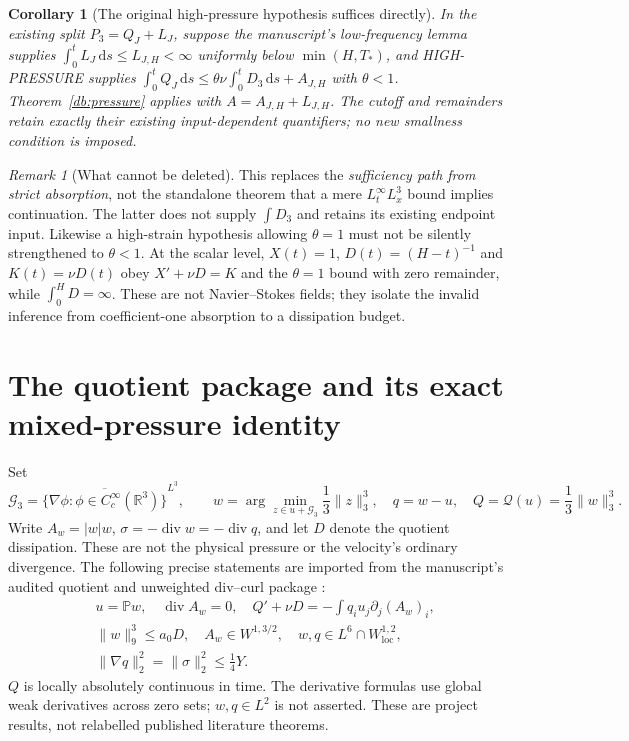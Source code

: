 \documentclass[11pt,a4paper]{article}
\newtheorem{corollary}[theorem]{Corollary}
\theoremstyle{definition}\newtheorem{hypothesis}[theorem]{Hypothesis}
\theoremstyle{remark}\newtheorem{remark}[theorem]{Remark}
\newcommand{\R}{\mathbb R}
\newcommand{\PP}{\mathbb P}
\newcommand{\Q}{\mathcal Q}
\newcommand{\G}{\mathcal G_3}
\newcommand{\dd}{\,\mathrm d}
\newcommand{\norm}[1]{\lVert #1\rVert}
\newcommand{\diver}{\operatorname{div}}
\numberwithin{equation}{section}
\begin{document}
\begin{corollary}[The original high-pressure hypothesis suffices directly]
In the existing split $P_3=Q_J+L_J$, suppose the manuscript's low-frequency
lemma supplies
$\int_0^tL_J\dd s\le L_{J,H}<\infty$ uniformly below $\min(H,T_*)$,
and HIGH-PRESSURE supplies
$\int_0^tQ_J\dd s\le\theta\nu\int_0^tD_3\dd s+A_{J,H}$
with $\theta<1$. Theorem~\ref{db:pressure} applies with
$A=A_{J,H}+L_{J,H}$. The cutoff and remainders retain exactly their existing
input-dependent quantifiers; no new smallness condition is imposed.
\end{corollary}

\begin{remark}[What cannot be deleted]
This replaces the \emph{sufficiency path from strict absorption}, not the
standalone theorem that a mere $L^\infty_tL^3_x$ bound implies continuation.
The latter does not supply $\int D_3$ and retains its existing endpoint input.
Likewise a high-strain hypothesis allowing $\theta=1$ must not be silently
strengthened to $\theta<1$. At the scalar level, $X(t)=1$,
$D(t)=(H-t)^{-1}$ and $K(t)=\nu D(t)$ obey $X'+\nu D=K$ and the
$\theta=1$ bound with zero remainder, while $\int_0^H D=\infty$.
These are not Navier--Stokes fields; they isolate the invalid inference from
coefficient-one absorption to a dissipation budget.
\end{remark}

\section{The quotient package and its exact mixed-pressure identity}
Set
\[
 \G=\overline{\{\nabla\phi:\phi\in C_c^\infty(\R^3)\}}^{L^3},\qquad
 w=\arg\min_{z\in u+\G}\frac13\norm z_3^3,
 \quad q=w-u,\quad Q=\Q(u)=\frac13\norm w_3^3.
\]
Write $A_w=|w|w$, $\sigma=-\diver w=-\diver q$, and let $D$ denote the
quotient dissipation. These are not the physical pressure or the velocity's
ordinary divergence. The following precise statements are imported from the
manuscript's audited quotient and unweighted div--curl package
\cite{paper,hf25}:
\begin{align}
 &u=\PP w,\quad\diver A_w=0,\quad
 Q'+\nu D=-\int q_i u_j\partial_j(A_w)_i,\label{db:Qidentity}\\
 &\norm w_9^3\le a_0D,\quad A_w\in W^{1,3/2},\quad
 w,q\in L^6\cap W^{1,2}_{\mathrm{loc}},\label{db:Qtoolkit}\\
 &\norm{\nabla q}_2^2=\norm\sigma_2^2\le\frac14Y.
 \label{db:defectspatial}
\end{align}
$Q$ is locally absolutely continuous in time. The derivative formulas use
global weak derivatives across zero sets; $w,q\in L^2$ is not asserted.
These are project results, not relabelled published literature theorems.
\end{document}

